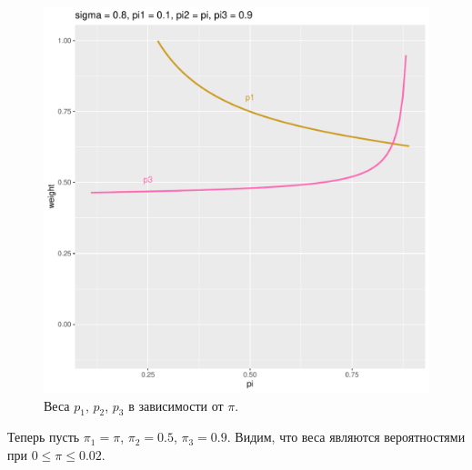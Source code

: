 \documentclass[12pt]{article}
\begin{document}
\begin{figure}[!hhh]
	\begin{center}
		\begin{minipage}[h]{0.95\linewidth}
			\includegraphics[width=1\linewidth]{img/p123_2.pdf}
			\caption{Веса $p_{1}$, $p_{2}$, $p_{3}$ в зависимости от $\pi$. } %
			\label{ris11} %
		\end{minipage}
	\end{center}
\end{figure}

Теперь пусть $\pi_{1} = \pi$, $\pi_{2} = 0.5$, $\pi_{3} = 0.9$. Видим, что веса являются вероятностями при  $0 \leq \pi \leq 0.02$.
\end{document}
